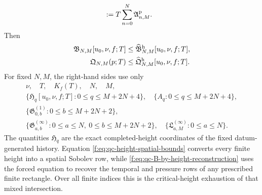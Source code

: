 \begin{proposition}
\begin{align}
 &:={}
 T\sum_{n=0}^{N}\mathfrak A^{\rm p}_{n,M}.
 \label{f:eq:qc-height-reconstructed-pressure}
\end{align}
Then
\begin{align}
 \mathfrak B_{N,M}[u_0,\nu,f;T]
 &\le\widehat{\mathfrak B}_{N,M}^{\rm h}[u_0,\nu,f;T],
 \label{f:eq:qc-B-by-height-reconstruction}\\
 \mathfrak Q_{N,M}(p;T)
 &\le\widehat{\mathfrak Q}_{N,M}^{\rm h}[u_0,\nu,f;T].
 \label{f:eq:qc-pressure-by-height-reconstruction}
\end{align}
For fixed \(N,M\), the right-hand sides use only
\begin{equation}
 \begin{gathered}
 \nu,\quad T,\quad K_f(T),\quad N,\quad M,\\
 \{\mathfrak H_q[u_0,\nu,f;T]:0\le q\le M+2N+4\},
 \quad\{A_q:0\le q\le M+2N+4\},\\
 \{\mathfrak G^{(1)}_{0,b}:0\le b\le M+2N+2\},\\
 \{\mathfrak G^{(\infty)}_{a,b}:0\le a\le N,\ 0\le b\le M+2N+2\},
 \quad
 \{\mathfrak L^{(\infty)}_{a,M}:0\le a\le N\}.
 \end{gathered}
 \label{f:eq:qc-height-reconstruction-dependence}
\end{equation}
The quantities \(\mathfrak H_q\) are the exact completed-height coordinates
of the fixed datum-generated history.  Equation
\eqref{f:eq:qc-height-spatial-bounds} converts every finite height into a spatial
Sobolev row, while \eqref{f:eq:qc-B-by-height-reconstruction} uses the forced
equation to recover the temporal and pressure rows of any prescribed finite
rectangle.  Over all finite indices this is the critical-height exhaustion of
that mixed intersection.
\end{proposition}

